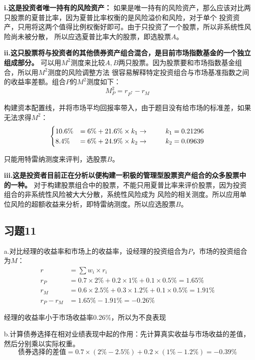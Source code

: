 \documentclass{article}
\begin{document}
\textbf{i.这是投资者唯一持有的风险资产：}
如果是唯一持有的风险资产，那么应该对比两只股票的夏普比率，因为夏普比率权衡的是风险溢价和风险，对于单个
投资资产，只用将这两个值得比例权衡好即可。由于只投资了一个股票，所以非系统性风险尚未被分散，
所以应选夏普比率大的股票，即选股票$A$。

\textbf{ii.这只股票将与投资者的其他债券资产组合混合，是目前市场指数基金的一个独立组成部分。}
可以用$M^2$测度来比较$A,B$两只股票。因为股票要和市场指数基金组合，所以用$M^2$测度的风险调整方法
很容易解释特定投资组合与市场基准指数之间的收益率差额。组合$P$的$M^2$测度如下：
\[M^2_P=r_{P^*}-r_M\]

构建资本配置线，并将市场平均回报率带入，由于题目没有给市场的标准差，如果无法求得$M^2$：
\nonumber
\begin{align}
    \begin{cases}
        10.6\%&=6\%+21.6\% \times k_1 \rightarrow\hspace*{25pt} k_1=0.21296\\
        8.4\%&=6\%+24.9\% \times k_2 \rightarrow \hspace*{25pt} k_2=0.09639\\
    \end{cases}
\end{align}

只能用特雷纳测度来评判，选股票$B$。

\textbf{iii.这是投资者目前正在分析以便构建一积极的管理型股票资产组合的众多股票中的一种。}
对于构建股票组合中的股票，不能只用夏普比率来评价股票，因为投资组合的非系统性风险被大大分散，系统性风险成为
风险的相关测度。所以应用单位风险的超额收益来分析，即特雷纳测度。所以应选股票$B$。

\subsection*{习题11}
a.对比经理的收益率和市场上的收益率，设经理的投资组合为$P$，市场的投资组合为$M$：
\begin{align}
    r&=\sum w_i \times r_i\\
    r_P&=0.7 \times 2\% + 0.2\times 1\%+0.1\times 0.5\%=1.65\%\\
    r_M&=0.6 \times 2.5\% + 0.3\times 1.2\%+0.1\times 0.5\%=1.91\%\\
    r_P-r_M&=1.65\%-1.91\%=-0.26\%
\end{align}

经理的收益率小于市场收益率0.26\%，所以为不良表现

b.计算债券选择在相对业绩表现中起的作用：先计算真实收益与市场收益的差值，然后分别乘以实际权重。
\[\text{债券选择的差值}=0.7 \times (2\%-2.5\%) + 0.2\times (1\%-1.2\%)=-0.39\%\]
\end{document}
